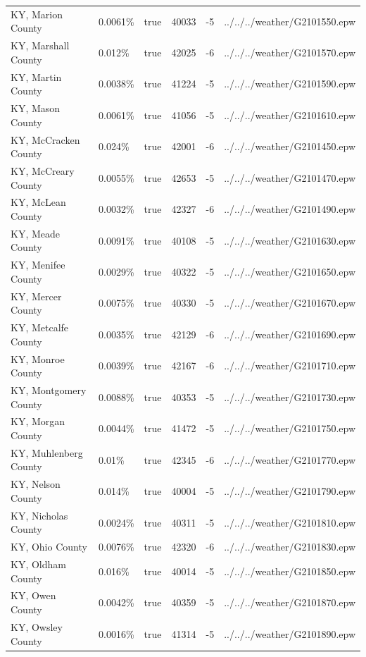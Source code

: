 \begin{longtable}[]{@{}llllll@{}}
KY, Marion County & 0.0061\% & true & 40033 & -5 &
../../../weather/G2101550.epw \\
KY, Marshall County & 0.012\% & true & 42025 & -6 &
../../../weather/G2101570.epw \\
KY, Martin County & 0.0038\% & true & 41224 & -5 &
../../../weather/G2101590.epw \\
KY, Mason County & 0.0061\% & true & 41056 & -5 &
../../../weather/G2101610.epw \\
KY, McCracken County & 0.024\% & true & 42001 & -6 &
../../../weather/G2101450.epw \\
KY, McCreary County & 0.0055\% & true & 42653 & -5 &
../../../weather/G2101470.epw \\
KY, McLean County & 0.0032\% & true & 42327 & -6 &
../../../weather/G2101490.epw \\
KY, Meade County & 0.0091\% & true & 40108 & -5 &
../../../weather/G2101630.epw \\
KY, Menifee County & 0.0029\% & true & 40322 & -5 &
../../../weather/G2101650.epw \\
KY, Mercer County & 0.0075\% & true & 40330 & -5 &
../../../weather/G2101670.epw \\
KY, Metcalfe County & 0.0035\% & true & 42129 & -6 &
../../../weather/G2101690.epw \\
KY, Monroe County & 0.0039\% & true & 42167 & -6 &
../../../weather/G2101710.epw \\
KY, Montgomery County & 0.0088\% & true & 40353 & -5 &
../../../weather/G2101730.epw \\
KY, Morgan County & 0.0044\% & true & 41472 & -5 &
../../../weather/G2101750.epw \\
KY, Muhlenberg County & 0.01\% & true & 42345 & -6 &
../../../weather/G2101770.epw \\
KY, Nelson County & 0.014\% & true & 40004 & -5 &
../../../weather/G2101790.epw \\
KY, Nicholas County & 0.0024\% & true & 40311 & -5 &
../../../weather/G2101810.epw \\
KY, Ohio County & 0.0076\% & true & 42320 & -6 &
../../../weather/G2101830.epw \\
KY, Oldham County & 0.016\% & true & 40014 & -5 &
../../../weather/G2101850.epw \\
KY, Owen County & 0.0042\% & true & 40359 & -5 &
../../../weather/G2101870.epw \\
KY, Owsley County & 0.0016\% & true & 41314 & -5 &
../../../weather/G2101890.epw \\

\end{longtable}
